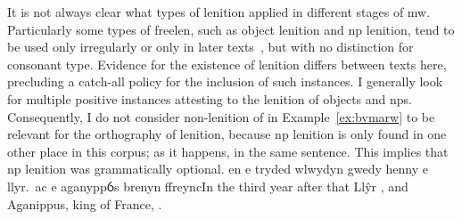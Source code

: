 It is not always clear what types of lenition applied in different
stages of \gls{mw}. Particularly some types of \gls{freelen},
such as object lenition and \gls{np} lenition, tend to be used only irregularly
or only in later texts~\autocite{van_development14}, but
with no distinction for consonant type. Evidence for the existence of
lenition differs between texts here, precluding a catch-all policy for
the inclusion of such instances. I generally look for multiple positive
instances attesting to the lenition of objects and \gls{np}s.
Consequently, I do not consider non-lenition of  in
Example~\ref{ex:bvmarw} to be relevant for the orthography of lenition,
because \gls{np} lenition is only found in one other place in this corpus; as it happens, in the same sentence.
This implies that \gls{np} lenition was grammatically optional.
{en e tryded wlwydyn gwedy henny e  llyr.\ ac e  aganyppỽs brenyn ffreync}{In the third year after that Llŷr , and Aganippus, king of France, .}

